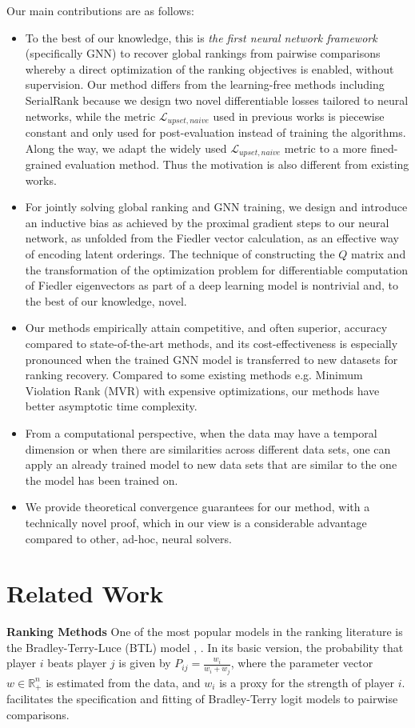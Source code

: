 \documentclass[nohyperref]{article}
\theoremstyle{plain}
\theoremstyle{definition}
\theoremstyle{remark}
\begin{document}
Our main contributions are as follows:
\begin{itemize}
    \item To the best of our knowledge, this is \emph{the first neural network framework} (specifically GNN) to recover global rankings from pairwise comparisons whereby a direct optimization of
the ranking objectives is enabled, without supervision. Our method
differs from the learning-free methods including SerialRank because we design two novel differentiable losses tailored to neural networks, while the metric $\mathcal{L}_{upset, naive}$ used in previous works is piecewise constant and only used for post-evaluation instead of training the algorithms. Along the way, we adapt the widely used $\mathcal{L}_{upset, naive}$ metric to a more fined-grained evaluation method. 
Thus the motivation is also different from existing works. 
\item For jointly solving global ranking and GNN training, we design and introduce an inductive bias as achieved by the proximal gradient steps to our neural network, as unfolded from the Fiedler vector calculation, as an effective way of encoding latent orderings. The technique of constructing the $Q$ matrix and the transformation of the optimization problem for differentiable computation of Fiedler eigenvectors as part of a deep learning model is nontrivial and, to the best of our knowledge, novel.
\item Our methods empirically attain competitive, and often superior,  accuracy compared to state-of-the-art methods, 
and its cost-effectiveness is especially pronounced when the trained GNN model is transferred to new datasets for ranking recovery. Compared to some 
existing methods e.g. Minimum Violation Rank (MVR) \cite{MVR_1986} with expensive optimizations, our methods have 
better asymptotic time complexity. 
\item From a computational perspective, when the data may have a temporal dimension or when there are 
similarities across different data sets, one can apply an already trained model 
to new data sets that are similar to the one the model has been trained on. 
\item We provide theoretical convergence guarantees for our method, with a technically novel proof, which in our view is a considerable advantage compared to other, ad-hoc, neural solvers.
\end{itemize}



\section{Related Work} \label{sec:relatedWork}
\textbf{Ranking Methods}
One of the most popular models in the ranking literature is the Bradley-Terry-Luce (BTL) model \cite{bradley1952rank}, \cite{luce1959individual}. 
In its basic version, the probability that player $i$ beats player $j$ is given by $P_{ij} = \frac{w_i}{w_i + w_j}$, where the parameter vector $w \in \mathbb{R}_{+}^n$
is estimated from the 
data, and $w_i$ is a proxy for the strength of player $i$.  \cite{firth2005bradley} 
facilitates the specification and fitting of Bradley-Terry logit models to pairwise comparisons.  
\end{document}
